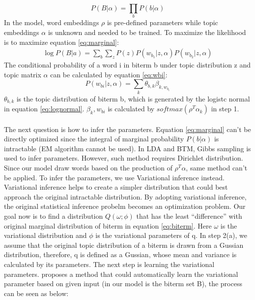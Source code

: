 \begin{equation}
    P(B|\alpha) = \prod_bP(b|\alpha)
    \label{eq:corpus}
\end{equation}
In the model, word embeddings $\rho$ is pre-defined parameters while topic embeddings $\alpha$ is unknown and needed to be trained.
To maximize the likelihood is to maximize equation \ref{eq:marginal}:
\begin{equation}
    \begin{aligned}
        \log P(B|a) = \sum_{b}\sum_zP(z)P(w_{b_1}|z,\alpha)P(w_{b_2}|z,\alpha)
    \end{aligned} 
    \label{eq:marginal}
\end{equation}
The conditional probability of a word i in biterm b under topic distribution z and topic matrix $\alpha$ can be calculated by equation \ref{eq:wbi}:
\begin{equation}
    P(w_{bi}|z,\alpha) = \sum_{k}\theta_{b,k}\beta_{k,w_{b_i}}
\label{eq:wbi}
\end{equation}
$\theta_{b,k}$ is the topic distribution of biterm b, which is generated by the logistc normal in equation \ref{eq:lognormal}. $\beta_k,w_{bi}$ is calculated by $softmax(\rho^T\alpha_k)$ in step 1.
\\\\
The next question is how to infer the parameters. Equation \ref{eq:marginal} can't be directly optimized since the integral of marginal probability $P(b|\alpha)$ is intractable (EM algorithm cannot be used). In LDA and BTM, Gibbs sampling is used to infer parameters. However, such method requires Dirichlet distribution. Since our model draw words based on the production of $\rho^T\alpha$, same method can't be applied. To infer the parameters, we use Variational inference\cite{wainwright2008graphical} instead. Variational inference helps to create a simpler distribution that could best approach the original intractable distribution. By adopting variational inference, the original statistical inference probelm becomes an optimization problem. Our goal now is to find a distribution $Q(\omega; \phi)$ that has the least ``difference'' with original marginal distribution of biterm in equation \ref{eq:biterm}. Here $\omega$ is the variational distribution and $\phi$ is the variational parameters of q.
In step 2(a), we assume that the original topic distribution of a biterm is drawn from a Gussian distribution, therefore, q is defined as a Gussian, whose mean and variance is calculated by its parameters. The next step is learning the variational parameters. \cite{kingma2013auto} proposes a method that could automatically learn the variational parameter based on given input (in our model is the biterm set B), the process can be seen as below:
